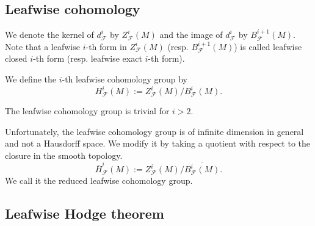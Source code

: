     \subsection{Leafwise cohomology}
    We denote the kernel of $d_{\mathcal{F}}^{i}$ by $Z_{\mathcal{F}}^{i}(M)$ and the image of $d_{\mathcal{F}}^{i}$ by $B_{\mathcal{F}}^{i+1}(M)$.
    Note that a leafwise $i$-th form in $Z_{\mathcal{F}}^{i}(M)$ (resp. $B_{\mathcal{F}}^{i+1}(M)$) is called leafwise closed $i$-th form (resp. leafwise exact $i$-th form).
    
    \begin{definition}
    We define the $i$-th leafwise cohomology group by
    \begin{equation*}
        H^{i}_{\mathcal{F}}(M):={Z_{\mathcal{F}}^{i}(M)}/{B_{\mathcal{F}}^{i}(M)}.
    \end{equation*}
    \end{definition}
    The leafwise cohomology group is trivial for $i>2$.
    
    Unfortunately, the leafwise cohomology group is of infinite dimension in general and not a Hausdorff space.
    We modify it by taking a quotient with respect to the closure in the smooth topology.
    \begin{equation*}
        \bar{H}^{i}_{\mathcal{F}}(M):= {Z_{\mathcal{F}}^{i}(M)}/{\overline{B_{\mathcal{F}}^{i}(M)}}.
    \end{equation*}
    We call it the reduced leafwise cohomology group.
    
    
    \subsection{Leafwise Hodge theorem}
    
